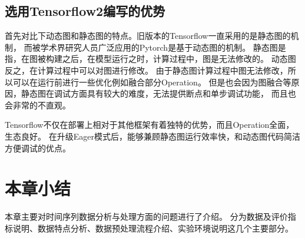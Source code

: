     \subsection{选用Tensorflow2编写的优势}
    首先对比下动态图和静态图的特点。旧版本的Tensorflow一直采用的是静态图的机制，
    而被学术界研究人员广泛应用的Pytorch是基于动态图的机制。
    静态图是指，在图被构建之后，在模型运行之时，计算过程中，图是无法修改的。
    动态图反之，在计算过程中可以对图进行修改。
    由于静态图计算过程中图无法修改，所以可以在运行前进行一些优化例如融合部分Operation。
    但是也会因为图融合等原因，静态图在调试方面具有较大的难度，无法提供断点和单步调试功能，
    而且也会非常的不直观。
  
    Tensorflow不仅在部署上相对于其他框架有着独特的优势，而且Operation全面，生态良好。
    在升级Eager模式后，能够兼顾静态图运行效率快，和动态图代码简洁方便调试的优点。
  

\section{本章小结}
本章主要对时间序列数据分析与处理方面的问题进行了介绍。
分为数据及评价指标说明、数据特点分析、数据预处理流程介绍、实验环境说明这几个主要部分。


